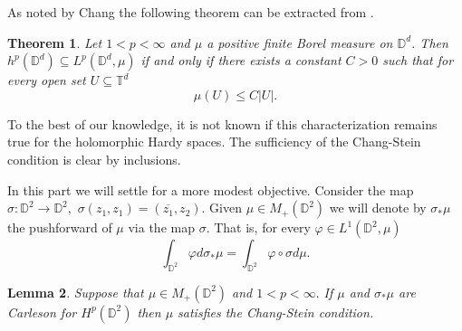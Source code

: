 \documentclass{amsart}
\numberwithin{equation}{section}
\newtheorem{thm}{Theorem}[section]
\newtheorem{lem}[thm]{Lemma}
\begin{document}
As noted by Chang \cite{Chang1979} the following theorem can be extracted from \cite[p. 236]{Stein1970}. 

\begin{thm} 	Let $  1<p < \infty$ and $\mu$ a positive finite Borel measure on $\mathbb{D}^d$. 
	Then $h^p(\mathbb{D}^d) \subseteq L^p(\mathbb{D}^d,\mu)$ if and only if there exists a constant $C>0$ such that for every open set $U \subseteq \mathbb{T}^d$ 
	\[ \mu(U) \leq C |U|. \]
	
	
\end{thm}

To the best of our knowledge, it is not known if this characterization remains true for the holomorphic Hardy spaces. The sufficiency of the Chang-Stein condition is clear by inclusions.

In this part we will settle for a more modest objective. Consider the map $\sigma : \mathbb{D}^2 \to \mathbb{D}^2, \,\, \sigma(z_1,z_1)=(\overline{z_1},z_2).$ Given $\mu \in M_+(\mathbb{D}^2)$ we will denote by $\sigma_*\mu$ the pushforward of $\mu$ via the map $\sigma. $ That is, for every $\varphi \in L^1(\mathbb{D}^2,\mu)$ 
\[ \int_{\mathbb{D}^2}\varphi d\sigma_* \mu = \int_{\mathbb{D}^2}\varphi\circ\sigma d\mu. \]

\begin{lem}\label{lem:symmetric_carleson}
	Suppose that $ \mu \in M_+(\mathbb{D}^2)$ and $1<p<\infty.$ If $\mu$ and $\sigma_*\mu$ are Carleson for $H^p(\mathbb{D}^2)$ then $\mu$ satisfies the Chang-Stein condition. 
\end{lem}
\end{document}
